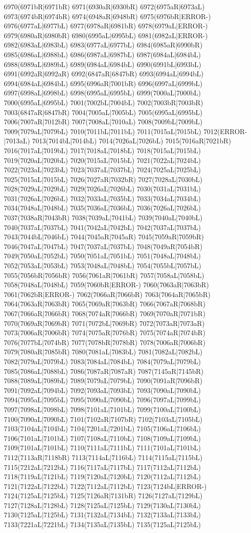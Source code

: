 6970(6971bR|6971bR) 6971(6930aR|6930bR) 6972(6975aR|6973aL) 6973(6974bR|6974bR) 6974(6948aR|6948bR) 6975(6976bR|ERROR-) 6976(6977aL|6977bL) 6977(6978aR|6981bR) 6978(6979aL|ERROR-) 6979(6980aR|6980bR) 6980(6995aL|6995bL) 6981(6982aL|ERROR-) 6982(6983aL|6983bL) 6983(6977aL|6977bL) 6984(6985aR|6990bR) 6985(6986aL|6988bL) 6986(6987aL|6987bL) 6987(6984aL|6984bL) 6988(6989aL|6989bL) 6989(6984aL|6984bL) 6990(6991bL|6993bL) 6991(6992aR|6992aR) 6992(6847aR|6847bR) 6993(6994aL|6994bL) 6994(6984aL|6984bL) 6995(6996aR|7001bR) 6996(6997aL|6999bL) 6997(6998aL|6998bL) 6998(6995aL|6995bL) 6999(7000aL|7000bL) 7000(6995aL|6995bL) 7001(7002bL|7004bL) 7002(7003bR|7003bR) 7003(6847aR|6847bR) 7004(7005aL|7005bL) 7005(6995aL|6995bL) 7006(7007aR|7012bR) 7007(7008aL|7010aL) 7008(7009bL|7009bL) 7009(7079aL|7079bL) 7010(7011bL|7011bL) 7011(7015aL|7015bL) 7012(ERROR-|7013aL) 7013(7014bL|7014bL) 7014(7026aL|7026bL) 7015(7016aR|7021bR) 7016(7017aL|7019bL) 7017(7018aL|7018bL) 7018(7015aL|7015bL) 7019(7020aL|7020bL) 7020(7015aL|7015bL) 7021(7022aL|7024bL) 7022(7023aL|7023bL) 7023(7037aL|7037bL) 7024(7025aL|7025bL) 7025(7015aL|7015bL) 7026(7027aR|7032bR) 7027(7028aL|7030bL) 7028(7029aL|7029bL) 7029(7026aL|7026bL) 7030(7031aL|7031bL) 7031(7026aL|7026bL) 7032(7033aL|7035bL) 7033(7034aL|7034bL) 7034(7048aL|7048bL) 7035(7036aL|7036bL) 7036(7026aL|7026bL) 7037(7038aR|7043bR) 7038(7039aL|7041bL) 7039(7040aL|7040bL) 7040(7037aL|7037bL) 7041(7042aL|7042bL) 7042(7037aL|7037bL) 7043(7044bL|7046bL) 7044(7045aR|7045aR) 7045(7059aR|7059bR) 7046(7047aL|7047bL) 7047(7037aL|7037bL) 7048(7049aR|7054bR) 7049(7050aL|7052bL) 7050(7051aL|7051bL) 7051(7048aL|7048bL) 7052(7053aL|7053bL) 7053(7048aL|7048bL) 7054(7055bL|7057bL) 7055(7056bR|7056bR) 7056(7061aR|7061bR) 7057(7058aL|7058bL) 7058(7048aL|7048bL) 7059(7060bR|ERROR-) 7060(7063aR|7063bR) 7061(7062bR|ERROR-) 7062(7066aR|7066bR) 7063(7064aR|7065bR) 7064(7063aR|7063bR) 7065(7069aR|7063bR) 7066(7067aR|7068bR) 7067(7066aR|7066bR) 7068(7074aR|7066bR) 7069(7070aR|7071bR) 7070(7069aR|7069bR) 7071(7072bL|7069bR) 7072(7073aR|7073aR) 7073(7006aR|7006bR) 7074(7075aR|7076bR) 7075(7074aR|7074bR) 7076(7077bL|7074bR) 7077(7078bR|7078bR) 7078(7006aR|7006bR) 7079(7080aR|7085bR) 7080(7081aL|7083bL) 7081(7082aL|7082bL) 7082(7079aL|7079bL) 7083(7084aL|7084bL) 7084(7079aL|7079bL) 7085(7086aL|7088bL) 7086(7087aR|7087aR) 7087(7145aR|7145bR) 7088(7089aL|7089bL) 7089(7079aL|7079bL) 7090(7091aR|7096bR) 7091(7092aL|7094bL) 7092(7093aL|7093bL) 7093(7090aL|7090bL) 7094(7095aL|7095bL) 7095(7090aL|7090bL) 7096(7097aL|7099bL) 7097(7098aL|7098bL) 7098(7101aL|7101bL) 7099(7100aL|7100bL) 7100(7090aL|7090bL) 7101(7102aR|7107bR) 7102(7103aL|7105bL) 7103(7104aL|7104bL) 7104(7201aL|7201bL) 7105(7106aL|7106bL) 7106(7101aL|7101bL) 7107(7108aL|7110bL) 7108(7109aL|7109bL) 7109(7101aL|7101bL) 7110(7111aL|7111bL) 7111(7101aL|7101bL) 7112(7113aR|7118bR) 7113(7114aL|7116bL) 7114(7115aL|7115bL) 7115(7212aL|7212bL) 7116(7117aL|7117bL) 7117(7112aL|7112bL) 7118(7119aL|7121bL) 7119(7120aL|7120bL) 7120(7112aL|7112bL) 7121(7122aL|7122bL) 7122(7112aL|7112bL) 7123(7124bL|ERROR-) 7124(7125aL|7125bL) 7125(7126aR|7131bR) 7126(7127aL|7129bL) 7127(7128aL|7128bL) 7128(7125aL|7125bL) 7129(7130aL|7130bL) 7130(7125aL|7125bL) 7131(7132aL|7134bL) 7132(7133aL|7133bL) 7133(7221aL|7221bL) 7134(7135aL|7135bL) 7135(7125aL|7125bL) 